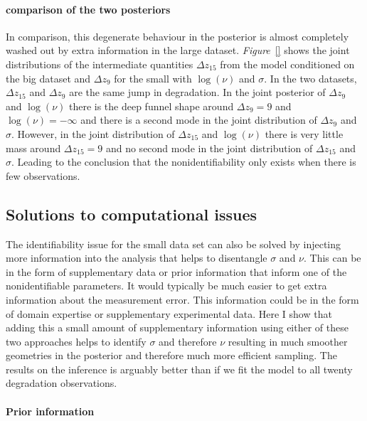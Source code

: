 \paragraph*{comparison of the two posteriors}
In comparison, this degenerate behaviour in the posterior is almost completely washed out by extra information in the large dataset. \textit{Figure}~\ref{} shows the joint distributions of the intermediate quantities $\Delta z_{15}$ from the model conditioned on the big dataset and $\Delta z_{9}$ for the small with $\log(\nu)$ and $\sigma$. In the two datasets, $\Delta z_{15}$ and $\Delta z_{9}$ are the same jump in degradation. In the joint posterior of $\Delta z_{9}$ and $\log(\nu)$ there is the deep funnel shape around $\Delta z_{9} = 9$ and $\log(\nu) = -\infty$ and there is a second mode in the joint distribution of $\Delta z_{9}$ and $\sigma$. However, in the joint distribution of $\Delta z_{15}$ and $\log(\nu)$ there is very little mass around $\Delta z_{15} = 9$ and no second mode in the joint distribution of $\Delta z_{15}$ and $\sigma$. Leading to the conclusion that the nonidentifiability only exists when there is few observations.

\subsection{Solutions to computational issues} \label{sec:comp-sols}

The identifiability issue for the small data set can also be solved by injecting more information into the analysis that helps to disentangle $\sigma$ and $\nu$. This can be in the form of supplementary data or prior information that inform one of the nonidentifiable parameters. It would typically be much easier to get extra information about the measurement error. This information could be in the form of domain expertise or supplementary experimental data. Here I show that adding this a small amount of supplementary information using either of these two approaches helps to identify $\sigma$ and therefore $\nu$ resulting in much smoother geometries in the posterior and therefore much more efficient sampling. The results on the inference is arguably better than if we fit the model to all twenty degradation observations.

\paragraph*{Prior information}

